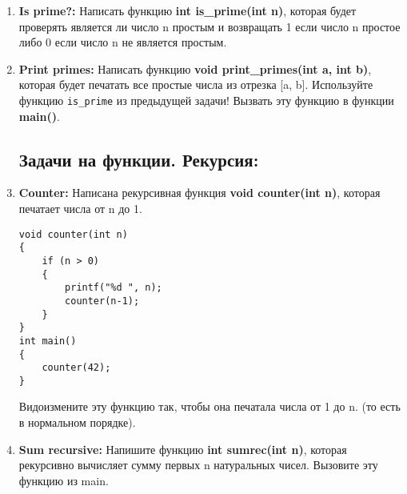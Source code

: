 \documentclass{article}
\begin{document}
\begin{enumerate}
\item \textbf{Is prime?:} Написать функцию \textbf{int is\_prime(int n)}, которая будет проверять является ли число n простым и возвращать 1 если число n простое либо 0 если число n не является простым.
\item \textbf{Print primes:} Написать функцию \textbf{void print\_primes(int a, int b)}, которая будет печатать все простые числа из отрезка [a, b]. Используйте функцию \texttt{is\_prime} из предыдущей задачи! Вызвать эту функцию в функции \textbf{main()}.

\newpage
\subsection*{Задачи на функции. Рекурсия:}
\item \textbf{Counter:} Написана рекурсивная функция \textbf{void counter(int n)}, которая печатает числа от n до 1.
\begin{lstlisting}
void counter(int n)
{
	if (n > 0)
	{
		printf("%d ", n);
		counter(n-1);
	}
}
int main()
{
	counter(42);
}
\end{lstlisting}
Видоизмените эту функцию так, чтобы она печатала числа от 1 до n. (то есть в нормальном порядке).

\item \textbf{Sum recursive:} Напишите функцию \textbf{int sumrec(int n)}, которая рекурсивно вычисляет сумму первых n натуральных чисел. Вызовите эту функцию из main.


\end{enumerate}
\end{document}
